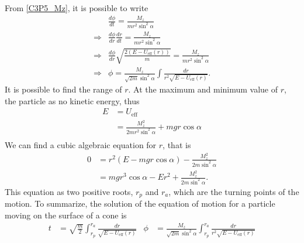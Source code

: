\begin{problem}
{From \eqref{C3P5_Mz}, it is possible to write
\begin{align*}
    &\frac{d\phi}{dt} = \frac{M_z}{mr^2\sin^2{\alpha}} \\
    \Rightarrow &\frac{d\phi}{dr}\frac{dr}{dt} = \frac{M_z}{mr^2\sin^2{\alpha}} \\
    \Rightarrow &\frac{d\phi}{dr} \sqrt{\frac{2\left(E-U_{\text{eff}}(r)\right)}{m}} = \frac{M_z}{mr^2\sin^2{\alpha}} \\
    \Rightarrow &\phi =\frac{M_z}{\sqrt{2m}\sin^2{\alpha}} \int \frac{dr}{r^2\sqrt{E-U_{\text{eff}}(r)}}.
\end{align*}
It is possible to find the range of $r$. At the maximum and minimum value of $r$, the particle as no kinetic energy, thus
\begin{align*}
    E &= U_{\text{eff}} \\
    &= \frac{M_z^2}{2mr^2\sin^2{\alpha}} + mgr\cos{\alpha} \\
\end{align*}
We can find a cubic algebraic equation for $r$, that is
\begin{align*}
    0 &= r^2\left( E - mgr\cos{\alpha} \right) - \frac{M_z^2}{2m\sin^2{\alpha}} \\
    &= mgr^3\cos{\alpha} - Er^2 + \frac{M_z^2}{2m\sin^2{\alpha}}.
\end{align*}
This equation as two positive roots, $r_p$ and $r_a$, which are the turning points of the motion. To summarize, the solution of the equation of motion for a particle moving on the surface of a cone is
}
{
\begin{align*}
  t &=  \sqrt{\frac{m}{2}} \int_{r_p}^{r_a} \frac{dr}{\sqrt{E-U_{\text{eff}}(r)}} & \phi &= \frac{M_z}{\sqrt{2m}\sin^2{\alpha}} \int_{r_p}^{r_a} \frac{dr}{r^2\sqrt{E-U_{\text{eff}}(r)}}
\end{align*}
}
\end{problem}


